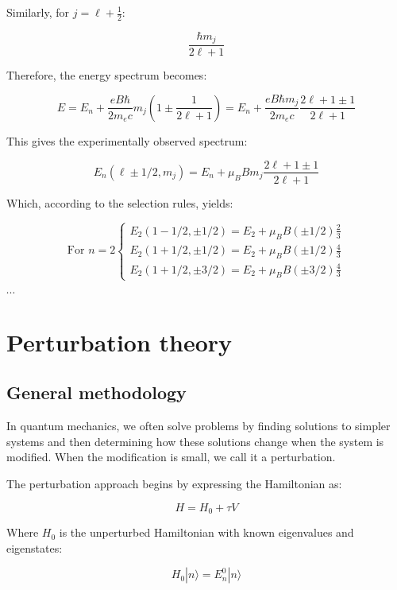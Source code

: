 \documentclass[italian]{HKNdocument}
\begin{document}
Similarly, for $j=\ell+\frac{1}{2}$:

\begin{equation}
\frac{\hbar m_j}{2\ell+1}
\end{equation}

Therefore, the energy spectrum becomes:

\begin{equation}
E=E_n+\frac{eB\hbar}{2m_e c}m_j\left(1\pm\frac{1}{2\ell+1}\right)=E_n+\frac{eB\hbar m_j}{2m_e c}\frac{2\ell+1\pm 1}{2\ell+1}
\end{equation}

This gives the experimentally observed spectrum:

\begin{equation}
E_n(\ell\pm 1/2,m_j)=E_n+\mu_B Bm_j\frac{2\ell+1\pm 1}{2\ell+1}
\end{equation}

Which, according to the selection rules, yields:

\[
\text{For } n=2\left\{\begin{array}{l}
E_2(1-1/2,\pm 1/2)=E_2+\mu_B B(\pm 1/2)\frac{2}{3} \\
E_2(1+1/2,\pm 1/2)=E_2+\mu_B B(\pm 1/2)\frac{4}{3}\\
E_2(1+1/2,\pm 3/2)=E_2+\mu_B B(\pm 3/2)\frac{4}{3}
\end{array}\right.
\]

$\cdots$

\section{Perturbation theory}
\subsection{General methodology}
In quantum mechanics, we often solve problems by finding solutions to simpler systems and then determining how these solutions change when the system is modified. When the modification is small, we call it a perturbation.


The perturbation approach begins by expressing the Hamiltonian as:

\begin{equation}
H=H_0+\tau V
\end{equation}

Where $H_0$ is the unperturbed Hamiltonian with known eigenvalues and eigenstates:

\begin{equation}
H_0|n\rangle=E_n^0|n\rangle
\end{equation}
\end{document}
